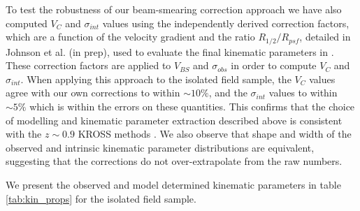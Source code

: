 \documentclass[fleqn,usenatbib]{mn2e}
\begin{document}
To test the robustness of our beam-smearing correction approach we have also computed $V_{C}$ and $\sigma_{int}$ values using the independently derived correction factors, which are a function of the velocity gradient and the ratio $R_{1/2}/R_{psf}$, detailed in Johnson et al. (in prep), used to evaluate the final kinematic parameters in \cite{Harrison2017}.
These correction factors are applied to $V_{BS}$ and $\sigma_{obs}$ in order to compute $V_{C}$ and $\sigma_{int}$.
When applying this approach to the isolated field sample, the $V_{C}$ values agree with our own corrections to within $\sim10\%$, and the $\sigma_{int}$ values to within $\sim5\%$ which is within the errors on these quantities. 
This confirms that the choice of modelling and kinematic parameter extraction described above is consistent with the $z\sim0.9$ KROSS methods \citep{Harrison2017}.
We also observe that shape and width of the observed and intrinsic kinematic parameter distributions are equivalent, suggesting that the corrections do not over-extrapolate from the raw numbers.

We present the observed and model determined kinematic parameters in table \ref{tab:kin_props} for the isolated field sample.
\end{document}
